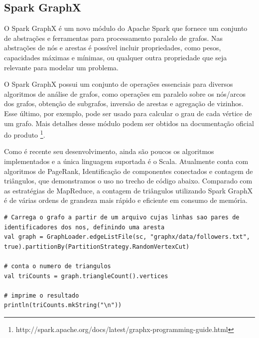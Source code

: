 \subsection{Spark GraphX}
O Spark GraphX é um novo módulo do Apache Spark que fornece um conjunto de abstrações e ferramentas para processamento paralelo de grafos. Nas abstrações de nós e arestas é possível incluir propriedades, como pesos, capacidades máximas e mínimas, ou qualquer outra propriedade que seja relevante para modelar um problema. 

O Spark GraphX possui um conjunto de operações essenciais para diversos algoritmos de análise de grafos, como operações em paralelo sobre os nós/arcos dos grafos, obtenção de subgrafos, inversão de arestas e agregação de vizinhos. Esse último, por exemplo, pode ser usado para calcular o grau de cada vértice de um grafo. Mais detalhes desse módulo podem ser obtidos na documentação oficial do produto \footnote{http://spark.apache.org/docs/latest/graphx-programming-guide.html}. 

Como é recente seu desenvolvimento, ainda são poucos os algoritmos implementados e a única linguagem suportada é o Scala. Atualmente conta com algoritmos de PageRank, Identificação de componentes conectados e contagem de triângulos, que demonstramos o uso no trecho de código abaixo. Comparado com as estratégias de MapReduce, a contagem de triângulos utilizando Spark GraphX é de várias ordens de grandeza mais rápido e eficiente em consumo de memória. 

\begin{lstlisting}[style=MyPythonStyle]
# Carrega o grafo a partir de um arquivo cujas linhas sao pares de identificadores dos nos, definindo uma aresta
val graph = GraphLoader.edgeListFile(sc, "graphx/data/followers.txt", true).partitionBy(PartitionStrategy.RandomVertexCut)

# conta o numero de triangulos
val triCounts = graph.triangleCount().vertices

# imprime o resultado
println(triCounts.mkString("\n"))
\end{lstlisting}
